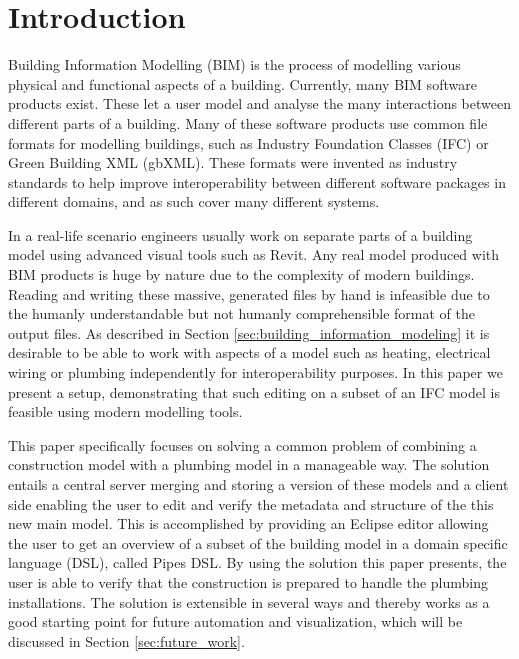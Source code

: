 


\setcounter{page}{1}
\section{Introduction}
Building Information Modelling (BIM) is the process of modelling various physical and functional aspects of a building. Currently, many BIM software products exist. These let a user model and analyse the many interactions between different parts of a building. Many of these software products use common file formats for modelling buildings, such as Industry Foundation Classes (IFC) or Green Building XML (gbXML). These formats were invented as industry standards to help improve interoperability between different software packages in different domains, and as such cover many different systems.

In a real-life scenario engineers usually work on separate parts of a building model using advanced visual tools such as Revit\cite{revit12}. Any real model produced with BIM products is huge by nature due to the complexity of modern buildings. Reading and writing these massive, generated files by hand is infeasible due to the humanly understandable but not humanly comprehensible format of the output files. As described in Section \ref{sec:building_information_modeling} it is desirable to be able to work with aspects of a model such as heating, electrical wiring or plumbing independently for interoperability purposes. In this paper we present a setup, demonstrating that such editing on a subset of an IFC model is feasible using modern modelling tools.

This paper specifically focuses on solving a common problem of combining a construction model with a plumbing model in a manageable way. The solution entails a central server merging and storing a version of these models and a client side enabling the user to edit and verify the metadata and structure of the this new main model. This is accomplished by providing an Eclipse editor allowing the user to get an overview of a subset of the building model in a domain specific language (DSL), called Pipes DSL. By using the solution this paper presents, the user is able to verify that the construction is prepared to handle the plumbing installations. The solution is extensible in several ways and thereby works as a good starting point for future automation and visualization, which will be discussed in Section \ref{sec:future_work}. 

